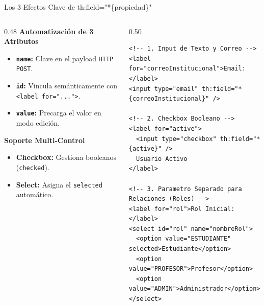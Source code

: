 \documentclass[aspectratio=169]{beamer}
\begin{document}
\begin{frame}[fragile]{Los 3 Efectos Clave de th:field="*\{propiedad\}"}
\begin{columns}[c]
\begin{column}{0.48\textwidth}
  \textbf{Automatizaci\'on de 3 Atributos}
  \begin{itemize}
    \item \textbf{\texttt{name}:} Clave en el payload \texttt{HTTP POST}.
    \item \textbf{\texttt{id}:} Vincula sem\'anticamente con \texttt{<label for="...">}.
    \item \textbf{\texttt{value}:} Precarga el valor en modo edici\'on.
  \end{itemize}
  \vspace{3pt}
  \textbf{Soporte Multi-Control}
  \begin{itemize}
    \item \textbf{Checkbox:} Gestiona booleanos (\texttt{checked}).
    \item \textbf{Select:} Asigna el \texttt{selected} autom\'atico.
  \end{itemize}
\end{column}
\begin{column}{0.50\textwidth}
\begin{lstlisting}[style=ThymeleafStyle]
<!-- 1. Input de Texto y Correo -->
<label for="correoInstitucional">Email:</label>
<input type="email" th:field="*{correoInstitucional}" />

<!-- 2. Checkbox Booleano -->
<label for="active">
  <input type="checkbox" th:field="*{active}" />
  Usuario Activo
</label>

<!-- 3. Parametro Separado para Relaciones (Roles) -->
<label for="rol">Rol Inicial:</label>
<select id="rol" name="nombreRol">
  <option value="ESTUDIANTE" selected>Estudiante</option>
  <option value="PROFESOR">Profesor</option>
  <option value="ADMIN">Administrador</option>
</select>
\end{lstlisting}
\end{column}
\end{columns}
\end{frame}


\end{document}
